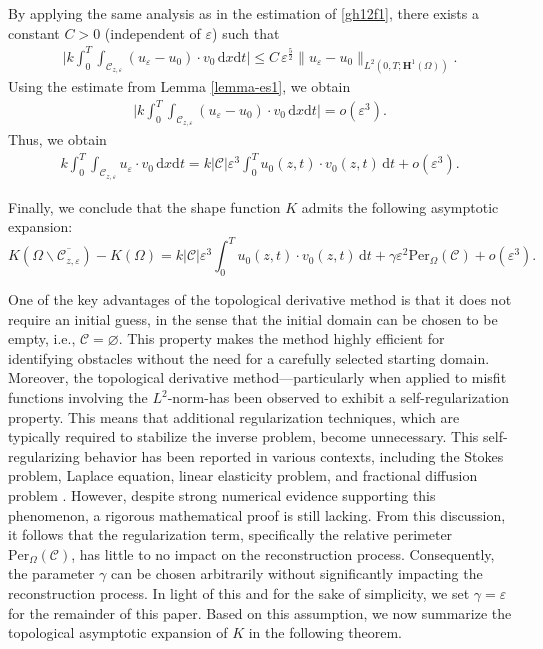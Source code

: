 \documentclass[a4paper,12pt,reqno,natbib]{amsart}
\newcommand{\dx} {\displaystyle\mathrm{d}x}
\newcommand{\dt} {\displaystyle\mathrm{d}t}
\def\H{\textbf{H}}
\begin{document}
By applying the same analysis as in the estimation of \eqref{gh12f1}, there exists a constant \( C > 0 \) (independent of \( \varepsilon \)) such that
\begin{align*}
    \big| k\int_0^{T}\int_{\mathcal{C}_{z,\varepsilon}} (u_\varepsilon - u_0) \cdot v_0 \,\dx\dt \big|  
    \leq C\,\varepsilon^{\frac{5}{2}} \big\|u_\varepsilon - u_0\big\|_{L^2(0,T;\H^1(\Omega))}.
\end{align*}
Using the estimate from Lemma \ref{lemma-es1}, we obtain
\begin{align*}
    \big| k\int_0^{T}\int_{\mathcal{C}_{z,\varepsilon}} (u_\varepsilon - u_0) \cdot v_0 \,\dx\dt \big| = o(\varepsilon^3).
\end{align*}
Thus, we obtain
\begin{align*}
   k\int_0^{T}\int_{\mathcal{C}_{z,\varepsilon}} u_\varepsilon \cdot v_0 \,\dx\dt
   =  k |\mathcal{C}| \varepsilon^3 \int_0^T u_0(z,t) \cdot v_0(z,t) \,\dt + o(\varepsilon^3).
\end{align*}

Finally, we conclude that the shape function \( K \) admits the following asymptotic expansion:
\begin{equation*}
    K(\Omega\backslash\overline{\mathcal{C}_{z,\varepsilon}}) - K(\Omega) 
    = k |\mathcal{C}| \varepsilon^3 \int_0^T u_0(z,t) \cdot v_0(z,t) \,\dt + \gamma\varepsilon^{2}\text{Per}_\Omega(\mathcal{C})+o(\varepsilon^3).
\end{equation*}


One of the key advantages of the topological derivative method is that it does not require an initial guess, in the sense that the initial domain can be chosen to be empty, i.e., \( \mathcal{C} = \varnothing \). This property makes the method highly efficient for identifying obstacles without the need for a carefully selected starting domain. Moreover, the topological derivative method—particularly when applied to misfit functions involving the \( L^2 \)-norm-has been observed to exhibit a self-regularization property. This means that additional regularization techniques, which are typically required to stabilize the inverse problem, become unnecessary. This self-regularizing behavior has been reported in various contexts, including the Stokes problem, Laplace equation, linear elasticity problem, and fractional diffusion problem \cite{AmstutzCC2005,CanelasIP2015,CanelasJCP2014,CaubetIP2012,CaubetIPI2016,hrizi2019new, FerreiraIP2017,FernandezAA2018,RochaSMO2017,menoret2020kohn,prakash2021noniterative}. However, despite strong numerical evidence supporting this phenomenon, a rigorous mathematical proof is still lacking. From this discussion, it follows that the regularization term, specifically the relative perimeter \( \text{Per}_\Omega(\mathcal{C}) \), has little to no impact on the reconstruction process. Consequently, the parameter \( \gamma \) can be chosen arbitrarily without significantly impacting the reconstruction process. In light of this and for the sake of simplicity, we set \( \gamma = \varepsilon \) for the remainder of this paper. Based on this assumption, we now summarize the topological asymptotic expansion of \( K \) in the following theorem.
\end{document}
